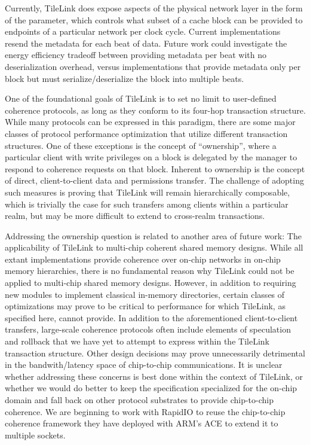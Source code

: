 Currently, TileLink does expose aspects of the physical network layer in the form of the  parameter, which
controls what subset of a cache block can be provided to endpoints of a particular network per clock cycle.
Current implementations resend the metadata for each beat of data.
Future work could investigate the energy efficiency tradeoff between providing metadata per beat with no deserialization overhead,
versus implementations that provide metadata only per block but must serialize/deserialize the block into multiple beats. 

One of the foundational goals of TileLink is to set no limit to user-defined coherence protocols, as long as they conform to
its four-hop transaction structure.
While many protocols can be expressed in this paradigm, there are some major classes of protocol performance optimization that
utilize different transaction structures.
One of these exceptions is the concept of ``ownership'', where a particular client with write privileges on a block is delegated by the manager
to respond to coherence requests on that block.
Inherent to ownership is the concept of direct, client-to-client data and permissions transfer.
The challenge of adopting such measures is proving that TileLink will remain hierarchically composable,
which is trivially the case for such transfers among clients within a particular realm,
but may be more difficult to extend to cross-realm transactions.

Addressing the ownership question is related to another area of future work:
The applicability of TileLink to multi-chip coherent shared memory designs.
While all extant implementations provide coherence over on-chip networks in on-chip memory hierarchies,
there is no fundamental reason why TileLink could not be applied to multi-chip shared memory designs.
However, in addition to requiring new modules to implement classical in-memory directories,
certain classes of optimizations may prove to be critical to performance for which TileLink, as specified here, cannot provide.
In addition to the aforementioned client-to-client transfers, large-scale coherence protocols often include
elements of speculation and rollback that we have yet to attempt to express within the TileLink transaction structure.
Other design decisions may prove unnecessarily detrimental in the bandwith/latency space of chip-to-chip communications.
It is unclear whether addressing these concerns is best done within the context of TileLink, or whether we would
do better to keep the specification specialized for the on-chip domain and fall back on other
protocol substrates to provide chip-to-chip coherence.
We are beginning to work with RapidIO to reuse the chip-to-chip coherence framework
they have deployed with ARM's ACE to extend it to multiple sockets.

